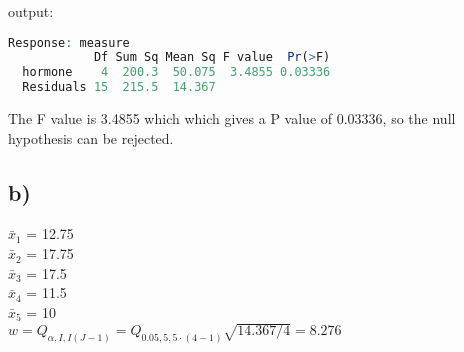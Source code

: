 \documentclass[a4paper,11pt]{article}
\begin{document}
output:
\begin{lstlisting}[language=R]
  Response: measure
            Df Sum Sq Mean Sq F value  Pr(>F)  
  hormone    4  200.3  50.075  3.4855 0.03336
  Residuals 15  215.5  14.367     
\end{lstlisting}
\vspace{0.5cm}

The F value is 3.4855 which which gives a P value of 0.03336, so the null hypothesis can be rejected.

\subsection*{b)}

$\bar{x}_1$ = 12.75\\
$\bar{x}_2$ = 17.75\\
$\bar{x}_3$ = 17.5\\
$\bar{x}_4$ = 11.5\\
$\bar{x}_5$ = 10\\

$w = Q_{\alpha,I,I(J-1)} = Q_{0.05,5,5\cdot(4-1)} \sqrt{14.367 / 4} = 8.276$
\end{document}
